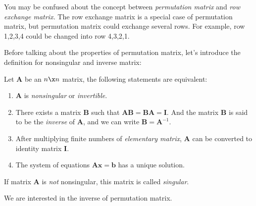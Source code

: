 \begin{remark}
You may be confused about the concept between \textit{permutation matrix} and \textit{row exchange matrix.} The row exchange matrix is a special case of permutation matrix, but permutation matrix could exchange several rows. For example, row 1,2,3,4 could be changed into row 4,3,2,1.
\end{remark}
Before talking about the properties of permutation matrix, let’s introduce the definition for
nonsingular and inverse matrix:
\begin{definition}
Let $\bm A$ be an $n\x n$ matrix, the following statements are equivalent:
\begin{enumerate}
\item
$\bm A$ is \emph{nonsingular} or \emph{invertible}.
\item
There exists a matrix $\bm B$ such that $\bm{AB}=\bm{BA}=\bm I$. And the matrix $\bm B$ is said to be the \emph{inverse} of $\bm A$, and we can write $\bm B=\bm A^{-1}.$
\item
After multiplying finite numbers of \emph{elementary matrix}, $\bm A$ can be converted to identity matrix $\bm I.$
\item
The system of equations $\bm{Ax}=\bm b$ has a unique solution.
\end{enumerate}
If matrix $\bm A$ is \emph{not} nonsingular, this matrix is called \emph{singular}.
\end{definition}
We are interested in the inverse of permutation matrix.

